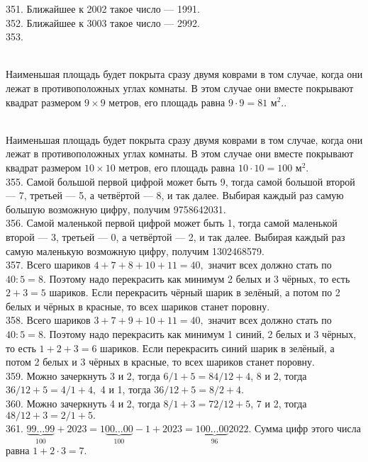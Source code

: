 351. Ближайшее к 2002 такое число --- 1991.\\
352. Ближайшее к 3003 такое число --- 2992.\\
353. \begin{figure}[ht!]
\end{figure}\\
Наименьшая площадь будет покрыта сразу двумя коврами в том случае, когда они лежат в противоположных углах комнаты. В этом случае они вместе покрывают квадрат размером $9\times9$ метров, его площадь равна $9\cdot9=81\text{ м}^2.$\newpage{}. \begin{figure}[ht!]
\end{figure}\\
Наименьшая площадь будет покрыта сразу двумя коврами в том случае, когда они лежат в противоположных углах комнаты. В этом случае они вместе покрывают квадрат размером $10\times10$ метров, его площадь равна $10\cdot10=100\text{ м}^2.$\\
355. Самой большой первой цифрой может быть 9, тогда самой большой второй --- 7, третьей --- 5, а четвёртой --- 8, и так далее. Выбирая каждый раз самую большую возможную цифру, получим 9758642031.\\
356. Самой маленькой первой цифрой может быть 1, тогда самой маленькой второй --- 3, третьей --- 0, а четвёртой --- 2, и так далее. Выбирая каждый раз самую маленькую возможную цифру, получим 1302468579.\\
357. Всего шариков $4+7+8+10+11=40,$ значит всех должно стать по $40:5=8.$ Поэтому надо перекрасить как минимум 2 белых и 3 чёрных, то есть $2+3=5$ шариков. Если перекрасить чёрный шарик в зелёный, а потом по 2 белых и чёрных в красные, то всех шариков станет поровну.\\
358. Всего шариков $3+7+9+10+11=40,$ значит всех должно стать по $40:5=8.$ Поэтому надо перекрасить как минимум 1 синий, 2 белых и 3 чёрных, то есть $1+2+3=6$ шариков. Если перекрасить синий шарик в зелёный, а потом 2 белых и 3 чёрных в красные, то всех шариков станет поровну.\\
359. Можно зачеркнуть 3 и 2, тогда $6/1+5=84/12+4$, 8 и 2, тогда $36/12+5=4/1+4,$ 4 и 1, тогда $36/12+5=8/2+4.$\\
360. Можно зачеркнуть 4 и 2, тогда $8/1+3=72/12+5$, 7 и 2, тогда $48/12+3=2/1+5.$\\
361. $\underbrace{99\ldots99}_{100}+2023=1\underbrace{00\ldots00}_{100}-1+2023=1\underbrace{00\ldots00}_{96}2022.$ Сумма цифр этого числа равна $1+2\cdot3=7.$\\
